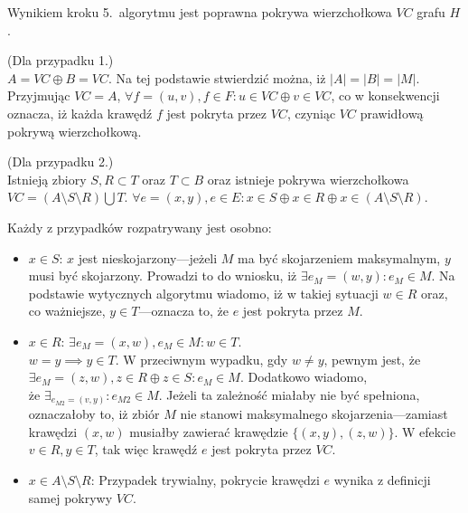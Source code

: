 \begin{theorem}\label{theorem_nf1}
  Wynikiem kroku 5.\ algorytmu jest poprawna pokrywa wierzchołkowa $VC$
  grafu $H$.
\end{theorem}
\begin{bproof}
  (Dla przypadku 1.) \\
  $A = VC \oplus B = VC$.
  Na tej podstawie stwierdzić można, iż ${|A|=|B|=|M|}$.
  Przyjmując $VC = A$, $\forall{f=(u,v), f\in F}: u \in VC \oplus v \in VC$, co
  w konsekwencji oznacza, iż każda krawędź $f$ jest pokryta przez $VC$, czyniąc
  $VC$ prawidłową pokrywą wierzchołkową.
\end{bproof}
\begin{bproof}
  (Dla przypadku 2.) \\
  Istnieją zbiory $S, R \subset T$ oraz $T \subset B$ oraz istnieje pokrywa 
  wierzchołkowa \\ $VC=(A \setminus S \setminus R) \bigcup T$.
  ${\forall{e=(x,y), e \in E}: x \in S \oplus x \in R \oplus x \in (A \setminus S
  \setminus R)}$.


  Każdy z przypadków rozpatrywany jest osobno:
  \begin{itemize}
    \item \underline{$x \in S$}: $x$ jest nieskojarzony---jeżeli $M$ ma być skojarzeniem 
      maksymalnym, $y$ musi być skojarzony.
      Prowadzi to do wniosku, iż $\exists{e_M=(w,y)}: e_M \in M$.
      Na podstawie wytycznych algorytmu wiadomo, iż w takiej sytuacji $w \in R$
      oraz, co ważniejsze, $y \in T$---oznacza to, że $e$ jest pokryta przez $M$.
    \item \underline{$x \in R$}: $\exists{e_M=(x,w), e_M\in M}: w \in T$. \\
      $w=y \implies y \in T$.
      W przeciwnym wypadku, gdy $w \neq y$, pewnym jest, że $\exists{e_M=(z,w),
      z \in R \oplus z \in S}: e_M \in M$.
      Dodatkowo wiadomo,\\że ${\exists_{e_{M2}=(v,y)}: e_{M2} \in M}$.
      Jeżeli ta zależność miałaby nie być spełniona, oznaczałoby to, iż zbiór $M$
      nie stanowi maksymalnego skojarzenia---zamiast krawędzi $(x,w)$ musiałby
      zawierać krawędzie $\{(x,y),(z,w)\}$.
      W efekcie $v \in R, y \in T$, tak więc krawędź $e$ jest pokryta przez $VC$.
    \item \underline{$x \in A \setminus S \setminus R$}: Przypadek trywialny,
      pokrycie krawędzi $e$ wynika z definicji samej pokrywy $VC$.
  \end{itemize}
\end{bproof}
